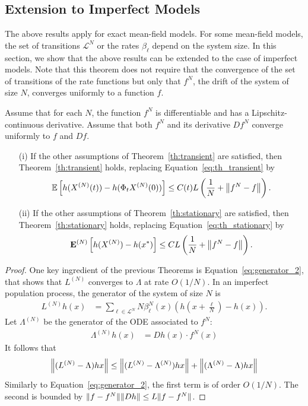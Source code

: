 \documentclass[sigconf]{acmart}
\newcommand\XN{X^{(N)}}
\newcommand\LN{L^{(N)}}
\newcommand\calL{\mathcal{L}}
\newcommand\esp[1]{{\mathchoice{\besp{#1}}{\sesp{#1}}{\sesp{#1}}{\sesp{#1}}}}
\newcommand\besp[1]{\mathbb{E}\left[#1\right]}
\newcommand\sesp[1]{\mathbb{E}[#1]}
\newcommand\espN[1]{{\mathchoice{\bespN{#1}}{\sespN{#1}}{\sespN{#1}}{\sespN{#1}}}}
\newcommand\bespN[1]{\mathbf{E}^{(N)}\left[#1\right]}
\newcommand\sespN[1]{\mathbf{E}^{(N)}[#1]}
\newcommand\norm[1]{{\mathchoice{\bnorm{#1}}{\snorm{#1}}{\snorm{#1}}{\snorm{#1}}}}
\newcommand\bnorm[1]{\left\|#1\right\|}
\newcommand\snorm[1]{\|#1\|}
\newcommand\p[1]{\left(#1\right)}
\begin{document}
\subsection{Extension to Imperfect Models}

The above results apply for exact mean-field models. For some
mean-field models, the set of transitions $\calL^N$ or the rates
$\beta_\ell$ depend on the system size. In this section, we show that
the above results can be extended to the case of imperfect models.
Note that this theorem does not require that the convergence of the
set of transitions of the rate functions but only that $f^N$, the
drift of the system of size $N$, converges uniformly to a function
$f$.

\begin{theorem}\label{th:imperfect}
  Assume that for each $N$, the function $f^N$ is differentiable and
  has a Lipschitz-continuous derivative. Assume that both $f^N$ and
  its derivative $Df^N$ converge uniformly to $f$ and $Df$. 
  \begin{itemize}
  \item[(i)] If the other assumptions of Theorem~\ref{th:transient}
    are satisfied, then Theorem~\ref{th:transient} holds, replacing
    Equation~\eqref{eq:th_transient} by
    \begin{align*}
      \esp{h(\XN(t)) - h(\Phi_t\XN(0))} %
      \le C(t)L\p{\frac{1}{N} + \norm{f^N-f}}. 
    \end{align*}
  \item[(ii)] If the other assumptions of Theorem~\ref{th:stationary}
    are satisfied, then Theorem~\ref{th:stationary} holds, replacing
    Equation~\eqref{eq:th_stationary} by
    \begin{align*}
      \espN{h(\XN)-h(x^*)} \le CL\p{\frac{1}{N} +
      \norm{f^N-f}}.
    \end{align*}
  \end{itemize}
\end{theorem}
\begin{proof}
  \newcommand\LNN{\widetilde{L}^{(N)}}
  \newcommand\LambdaN{\Lambda^{(N)}}
  
  One key ingredient of the previous Theorems is
  Equation~\eqref{eq:generator_2}, that shows that $\LN$ converges to
  $\Lambda$ at rate $O(1/N)$. In an imperfect population process, the
  generator of the system of size $N$ is
  \begin{align*}
    \LN h (x) &= \sum_{\ell\in\calL^N} N\beta^N_\ell(x) ( h(x+\frac{\ell}{N})-h(x) ).
  \end{align*}
  Let $\LambdaN$ be the generator of the ODE associated to $f^N$: 
  \begin{align*}
    \LambdaN h (x) &= D h(x) \cdot f^N(x)
  \end{align*}
  It follows that 
  \begin{align*}
    \norm{(\LN-\Lambda)hx} \le \norm{(\LN-\LambdaN)hx} +
    \norm{(\LambdaN-\Lambda)hx}
  \end{align*}
  Similarly to Equation~\eqref{eq:generator_2}, the first term is of
  order $O(1/N)$. The second is bounded by $\norm{f-f^N}\norm{Dh}\le
  L\norm{f-f^N}$. 
\end{proof}
\end{document}
